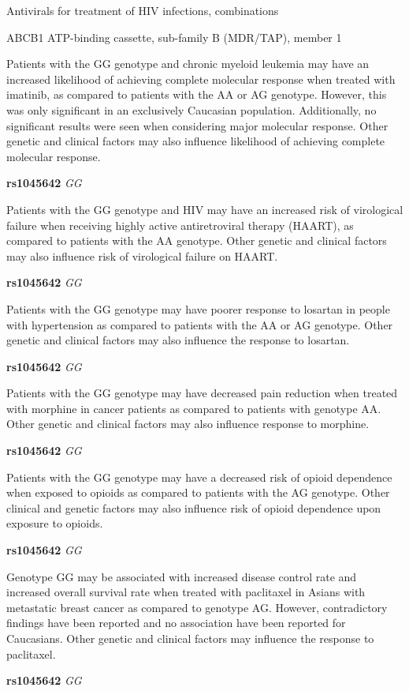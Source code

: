 \documentclass{resume} %
\begin{document}
\begin{rSection}{ Antivirals for treatment of HIV infections, combinations }
\begin{rSubsection}{ ABCB1 }{ ATP-binding cassette, sub-family B (MDR/TAP), member 1 }{}{}
\item[] Patients with the GG genotype and chronic myeloid leukemia may have an increased likelihood of achieving complete molecular response when treated with imatinib, as compared to patients with the AA or AG genotype. However, this was only significant in an exclusively Caucasian population. Additionally, no significant results were seen when considering major molecular response. Other genetic and clinical factors may also influence likelihood of achieving complete molecular response.\item \textbf{ rs1045642 } \textit{ GG }
\item[] Patients with the GG genotype and HIV may have an increased risk of virological failure when receiving highly active antiretroviral therapy (HAART), as compared to patients with the AA genotype. Other genetic and clinical factors may also influence risk of virological failure on HAART.\item \textbf{ rs1045642 } \textit{ GG }
\item[] Patients with the GG genotype may have poorer response to losartan in people with hypertension as compared to patients with the AA or AG genotype. Other genetic and clinical factors may also influence the response to losartan.\item \textbf{ rs1045642 } \textit{ GG }
\item[] Patients with the GG genotype may have decreased pain reduction when treated with morphine in cancer patients as compared to patients with genotype AA. Other genetic and clinical factors may also influence response to morphine.\item \textbf{ rs1045642 } \textit{ GG }
\item[] Patients with the GG genotype may have a decreased risk of opioid dependence when exposed to opioids as compared to patients with the AG genotype. Other clinical and genetic factors may also influence risk of opioid dependence upon exposure to opioids. \item \textbf{ rs1045642 } \textit{ GG }
\item[] Genotype GG may be associated with increased disease control rate and increased overall survival rate when treated with paclitaxel in Asians with metastatic breast cancer as compared to genotype AG. However, contradictory findings have been reported and no association have been reported for Caucasians. Other genetic and clinical factors may influence the response to paclitaxel.\item \textbf{ rs1045642 } \textit{ GG }

\end{rSubsection}
\end{rSection}
\end{document}
